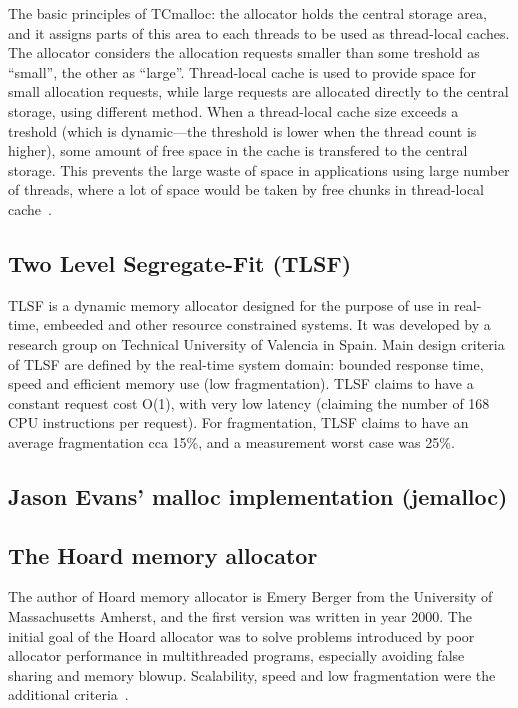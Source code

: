 The basic principles of TCmalloc: the allocator holds the central storage area,
and it assigns parts of this area to each threads to be used as thread-local
caches. The allocator considers the allocation requests smaller than some
treshold as ``small'', the other as ``large''. Thread-local cache is used to
provide space for small allocation requests, while large requests are allocated
directly to the central storage, using different method. When a thread-local
cache size exceeds a treshold (which is dynamic---the threshold is lower when
the thread count is higher), some amount of free space in the cache is
transfered to the central storage. This prevents the large waste of space in
applications using large number of threads, where a lot of space would be taken
by free chunks in thread-local cache~\cite{tcmalloc}.
\subsection{Two Level Segregate-Fit (TLSF)}
TLSF is a dynamic memory allocator designed for the purpose of use in
real-time, embeeded and other resource constrained systems. It was developed by
a research group on Technical University of Valencia in Spain. Main design
criteria of TLSF are defined by the real-time system domain: bounded response
time, speed and efficient memory use (low fragmentation). TLSF claims to have a
constant request cost O(1), with very low latency (claiming the number of 168
CPU instructions per request). For fragmentation, TLSF claims to have an average
fragmentation cca 15\%, and a measurement worst case was 25\%.
\subsection{Jason Evans' malloc implementation (jemalloc)}
\subsection{The Hoard memory allocator}
The author of Hoard memory allocator is Emery Berger from the University of
Massachusetts Amherst, and the first version was written in year 2000. The initial goal of the
Hoard allocator was to solve problems introduced by poor allocator performance
in multithreaded programs, especially avoiding false sharing and memory blowup.
Scalability, speed and low fragmentation were the additional
criteria~\cite{hoard}.

